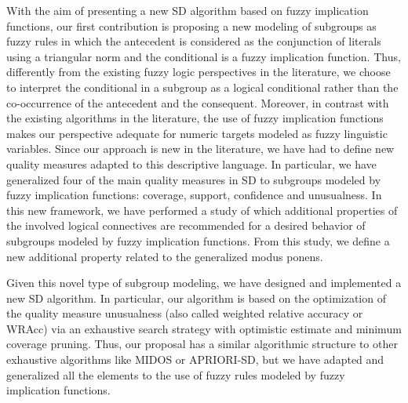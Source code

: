 With the aim of presenting a new SD algorithm based on fuzzy implication functions, our first contribution is proposing a new modeling of subgroups as fuzzy rules in which the antecedent is considered as the conjunction of literals using a triangular norm and the conditional is a fuzzy implication function. Thus, differently from the existing fuzzy logic perspectives in the literature, we choose to interpret the conditional in a subgroup as a logical conditional rather than the co-occurrence of the antecedent and the consequent. Moreover, in contrast with the existing algorithms in the literature, the use of fuzzy implication functions makes our perspective adequate for numeric targets modeled as fuzzy linguistic variables. Since our approach is new in the literature, we have had to define new quality measures adapted to this descriptive language. In particular, we have generalized four of the main quality measures in SD to subgroups modeled by fuzzy implication functions: coverage, support, confidence and unusualness. In this new framework, we have performed a study of which additional properties of the involved logical connectives are recommended for a desired behavior of subgroups modeled by fuzzy implication functions. From this study, we define a new additional property related to the generalized modus ponens. 

Given this novel type of subgroup modeling, we have designed and implemented a new SD algorithm. In particular, our algorithm is based on the optimization of the quality measure unusualness (also called weighted relative accuracy or WRAcc) via an exhaustive search strategy with optimistic estimate and minimum coverage pruning. Thus, our proposal has a similar algorithmic structure to other exhaustive algorithms like MIDOS or APRIORI-SD, but we have adapted and generalized all the elements to the use of fuzzy rules modeled by fuzzy implication functions.

